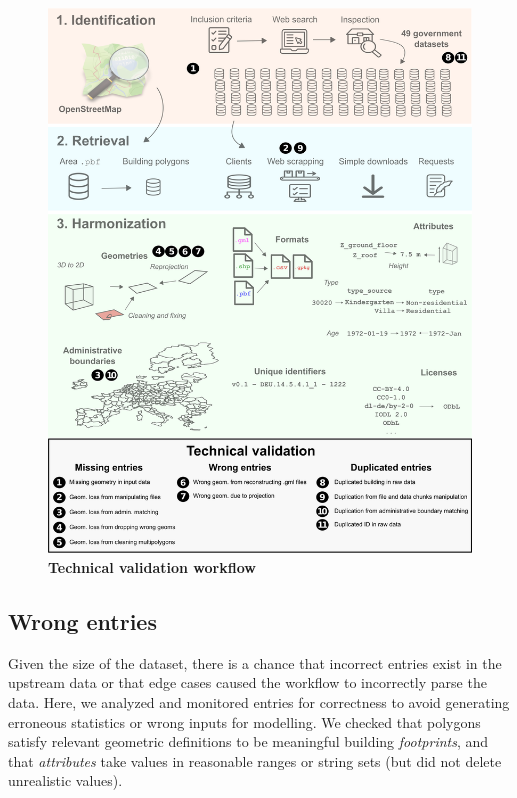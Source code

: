 \documentclass[fleqn,10pt]{wlscirep}
\begin{document}
\begin{figure}[H]
\centering
\includegraphics{figs/valid.png}
\caption{\textbf{Technical validation workflow}}
\label{fig:valid}
\end{figure}

\subsection*{Wrong entries}

Given the size of the dataset, there is a chance that incorrect entries exist in the upstream data or that edge cases caused the workflow to incorrectly parse the data. Here, we analyzed and monitored entries for correctness to avoid generating erroneous statistics or wrong inputs for modelling. We checked that polygons satisfy relevant geometric definitions to be meaningful building \textit{footprints}, and that \textit{attributes} take values in reasonable ranges or string sets (but did not delete unrealistic values).  
\end{document}
